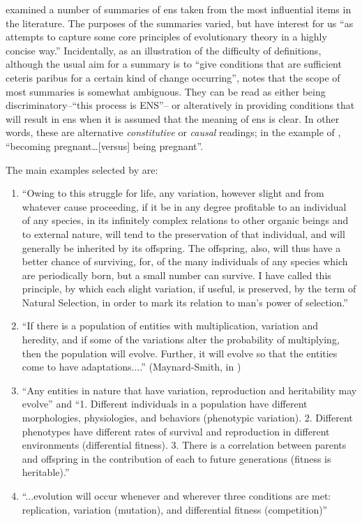 \Textcite{Godfrey-Smith2007} examined a number of summaries of \gls{ens} taken from the most influential items in the literature. The purposes of the summaries varied, but have interest for us ``as attempts to capture some core principles of evolutionary theory in a highly concise way.'' Incidentally, as an illustration of the difficulty of definitions, although the usual aim for a summary is to ``give conditions that are sufficient ceteris paribus for a certain kind of change occurring'', \textcite{Godfrey-Smith2007} notes that the scope of most summaries is somewhat ambiguous. They can be read as either being discriminatory--``this process is ENS''-- or alteratively in providing conditions that will result in \gls{ens} when it is assumed that the meaning of \gls{ens} is clear. In other words, these are alternative \emph{constitutive} or \emph{causal} readings; in the example of \textcite{Godfrey-Smith2007}, ``becoming pregnant\ldots{}{[}versus{]} being pregnant''.

The main examples selected by \textcite{Godfrey-Smith2007} are:

\begin{enumerate}
\item ``Owing to this struggle for life, any variation, however slight and from whatever cause proceeding, if it be in any degree profitable to an individual of any species, in its infinitely complex relations to other organic beings and to external nature, will tend to the preservation of that individual, and will generally be inherited by its offspring. The offspring, also, will thus have a better chance of surviving, for, of the many individuals of any species which are periodically born, but a small number can survive. I have called this principle, by which each slight variation, if useful, is preserved, by the term of Natural Selection, in order to mark its relation to man's power of selection.'' \parencite{Darwin1859}
\item ``If there is a population of entities with multiplication, variation and heredity, and if some of the variations alter the probability of multiplying, then the population will evolve. Further, it will evolve so that the entities come to have adaptations....'' (Maynard-Smith, in \textcite{Griesemer2001})
\item ``Any entities in nature that have variation, reproduction and heritability may evolve'' \parencite{Lewontin:1970mc} and ``1. Different individuals in a population have different morphologies, physiologies, and behaviors (phenotypic variation). 2. Different phenotypes have different rates of survival and reproduction in different environments (differential fitness). 3. There is a correlation between parents and offspring in the contribution of each to future generations (fitness is heritable).'' \parencite{Lewontin:1970mc}
\item ``...evolution will occur whenever and wherever three conditions are met: replication, variation (mutation), and differential fitness (competition)'' \parencite[quoting Daniel Dennett]{Ofria2004}
\end{enumerate}

